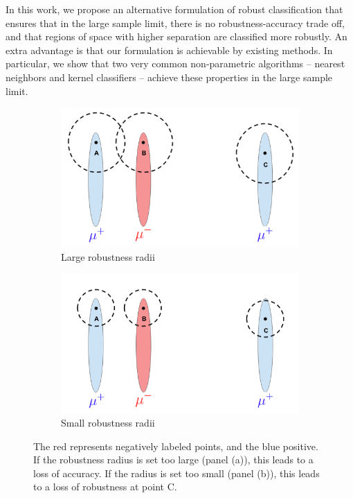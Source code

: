 In this work, we propose an alternative formulation of robust classification that ensures that in the large sample limit, there is no robustness-accuracy trade off, and that regions of space with higher separation are classified more robustly. An extra advantage is that our formulation is achievable by existing methods. In particular, we show that two very common non-parametric algorithms -- nearest neighbors and kernel classifiers -- achieve these properties in the large sample limit.


\begin{figure}
\begin{subfigure}{0.45\textwidth}
\includegraphics[width=\linewidth]{big_radius_robustness.png}
\caption{Large robustness radii} 
\end{subfigure}\hspace*{\fill}
\begin{subfigure}{0.45\textwidth}
\includegraphics[width=\linewidth]{small_radius_robustness.png}
\caption{Small robustness radii} 
\end{subfigure}

\caption{The red represents negatively labeled points, and the blue positive. If the robustness radius is set too large (panel (a)), this leads to a loss of accuracy. If the radius is set too small (panel (b)), this leads to a loss of robustness at point C.}\label{fig:intro}
\end{figure}

